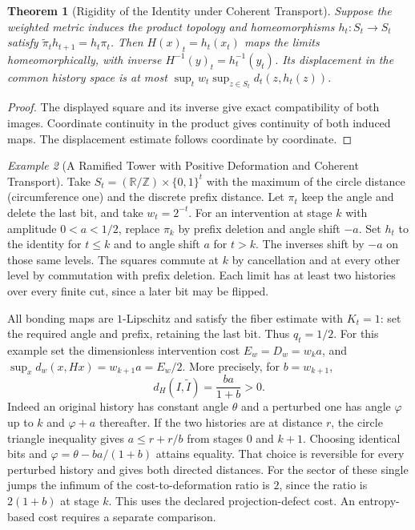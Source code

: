 \documentclass[11pt,a4paper]{article}
\theoremstyle{plain}
\newtheorem{theorem}{Theorem}[section]
\theoremstyle{definition}
\theoremstyle{remark}
\newtheorem{example}[theorem]{Example}
\begin{document}
\begin{theorem}[Rigidity of the Identity under Coherent Transport]\label{thm:rigidity}
Suppose the weighted metric induces the product topology and homeomorphisms $h_t:S_t\to S_t$ satisfy $\widetilde\pi_t h_{t+1}=h_t\pi_t$. Then $H(x)_t=h_t(x_t)$ maps the limits homeomorphically, with inverse $H^{-1}(y)_t=h_t^{-1}(y_t)$. Its displacement in the common history space is at most $\sup_t w_t\sup_{z\in S_t}d_t(z,h_t(z))$.
\end{theorem}
\begin{proof}
The displayed square and its inverse give exact compatibility of both images. Coordinate continuity in the product gives continuity of both induced maps. The displacement estimate follows coordinate by coordinate.
\end{proof}

\begin{example}[A Ramified Tower with Positive Deformation and Coherent Transport]\label{ex:coherent-rotation-tower}
Take $S_t=(\mathbb R/\mathbb Z)\times\{0,1\}^{t}$ with the maximum of the circle distance (circumference one) and the discrete prefix distance. Let $\pi_t$ keep the angle and delete the last bit, and take $w_t=2^{-t}$. For an intervention at stage $k$ with amplitude $0<a<1/2$, replace $\pi_k$ by prefix deletion and angle shift $-a$. Set $h_t$ to the identity for $t\leq k$ and to angle shift $a$ for $t>k$. The inverses shift by $-a$ on those same levels. The squares commute at $k$ by cancellation and at every other level by commutation with prefix deletion. Each limit has at least two histories over every finite cut, since a later bit may be flipped.

All bonding maps are $1$-Lipschitz and satisfy the fiber estimate with $K_t=1$: set the required angle and prefix, retaining the last bit. Thus $q_t=1/2$. For this example set the dimensionless intervention cost $E_w=D_w=w_k a$, and $\sup_x d_w(x,Hx)=w_{k+1}a=E_w/2$. More precisely, for $b=w_{k+1}$,
\[
 d_H(I,\widetilde I)=\frac{ba}{1+b}>0.
\]
Indeed an original history has constant angle $\theta$ and a perturbed one has angle $\varphi$ up to $k$ and $\varphi+a$ thereafter. If the two histories are at distance $r$, the circle triangle inequality gives $a\leq r+r/b$ from stages $0$ and $k+1$. Choosing identical bits and $\varphi=\theta-ba/(1+b)$ attains equality. That choice is reversible for every perturbed history and gives both directed distances. For the sector of these single jumps the infimum of the cost-to-deformation ratio is $2$, since the ratio is $2(1+b)$ at stage $k$. This uses the declared projection-defect cost. An entropy-based cost requires a separate comparison.
\end{example}
\end{document}
